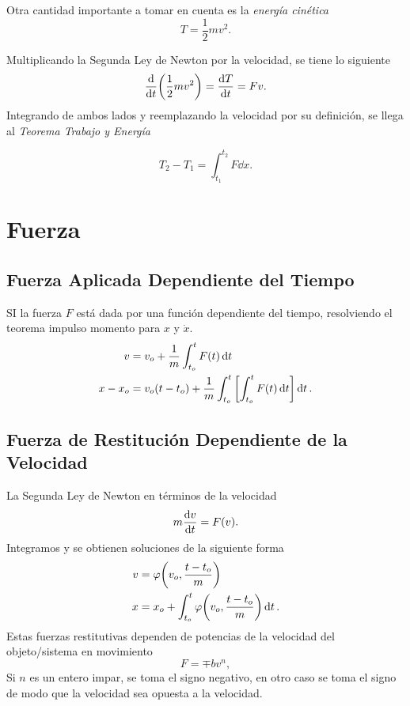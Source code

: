 Otra cantidad importante a tomar en cuenta es la \textit{energía cinética}
\begin{equation}
	T = \frac{1}{2} mv^2.
\end{equation}

Multiplicando la Segunda Ley de Newton por la velocidad, se tiene lo siguiente
\begin{equation}
	\dv{t} \qty(\frac{1}{2} mv^2) = \dv{T}{t} = Fv.
\end{equation}
Integrando de ambos lados y reemplazando la velocidad por su definición, se llega al \textit{Teorema Trabajo y Energía}

\begin{equation}
	T_2 - T_1 = \int _{t_1} ^{t_2} F \dd{x}.
\end{equation}

\section{Fuerza}

\subsection{Fuerza Aplicada Dependiente del Tiempo}

SI la fuerza $F$ está dada por una función dependiente del tiempo, resolviendo el teorema impulso momento para $x$ y $\dot{x}$.
\begin{align}
	v &= v_o + \frac{1}{m} \int _{t_o} ^t F(t) \dd{t} \\
	x - x_o &= v_o (t - t_o) + \frac{1}{m} \int _{t_o} ^t \qty[\int _{t_o} ^t F(t) \dd{t}] \dd{t} .
\end{align}


\subsection{Fuerza de Restitución Dependiente de la Velocidad}
La Segunda Ley de Newton en términos de la velocidad
\begin{equation}
	m\dv{v}{t} = F(v).
\end{equation}
Integramos y se obtienen soluciones de la siguiente forma
\begin{align*}
	v &= \varphi \qty(v_o , \frac{t - t_o}{m}) \\
	x &= x_o + \int _{t_o} ^t \varphi \qty(v_o , \frac{t - t_o}{m}) \dd{t}.
\end{align*}
Estas fuerzas restitutivas dependen de potencias de la velocidad del objeto/sistema en movimiento 
	\begin{equation}
		F = \mp bv^n,
	\end{equation}
Si $n$ es un entero impar, se toma el signo negativo, en otro caso se toma el signo de modo que la velocidad sea opuesta a la velocidad.

